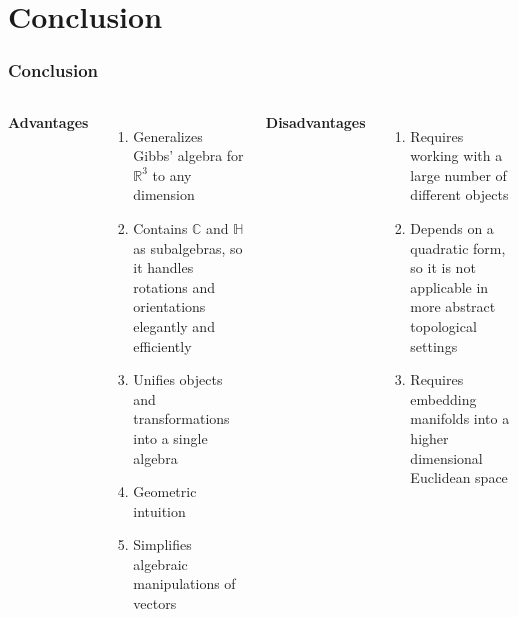 \documentclass{beamer}
\newcommand{\R}{\mathbb{R}}
\newcommand{\C}{\mathbb{C}}
\newcommand{\HM}{\mathbb{H}}
\begin{document}

\section{Conclusion}
\begin{frame}
\frametitle{Conclusion}
\begin{columns}[T]
    \textbf{Advantages}
    \begin{enumerate}
        \item Generalizes Gibbs' algebra for $\R^3$ to any dimension
        \pause
        \item Contains $\C$ and $\HM$ as subalgebras, so it handles rotations and orientations elegantly and efficiently
        \pause
        \item Unifies objects and transformations into a single algebra
        \pause
        \item Geometric intuition
        \pause
        \item Simplifies algebraic manipulations of vectors
    \end{enumerate}
    \textbf{Disadvantages}
    \begin{enumerate}
        \item Requires working with a large number of different objects
        \pause
        \item Depends on a quadratic form, so it is not applicable in more abstract topological settings
        \pause
        \item Requires embedding manifolds into a higher dimensional Euclidean space
    \end{enumerate}
\end{columns}
\end{frame}
\end{document}

